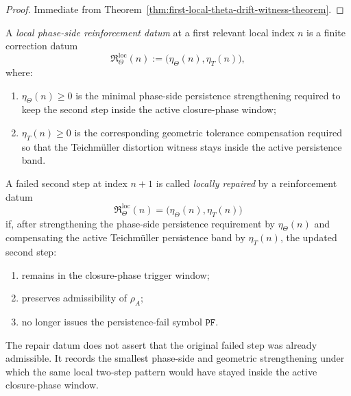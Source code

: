 \begin{proof}
Immediate from Theorem~\ref{thm:first-local-theta-drift-witness-theorem}.
\end{proof}


\begin{definition}
\label{def:local-phase-side-reinforcement-datum}
A \emph{local phase-side reinforcement datum} at a first relevant local index $n$ is a finite correction datum
\[
\mathfrak{R}_{\Theta}^{\mathrm{loc}}(n)
:=
\bigl(
\eta_{\Theta}(n),
\eta_{T}(n)
\bigr),
\]
where:
\begin{enumerate}
    \item $\eta_{\Theta}(n)\ge 0$ is the minimal phase-side persistence strengthening required to keep the second step inside the active closure-phase window;
    \item $\eta_{T}(n)\ge 0$ is the corresponding geometric tolerance compensation required so that the Teichm\"uller distortion witness stays inside the active persistence band.
\end{enumerate}
\end{definition}

\begin{definition}
\label{def:local-repaired-second-step}
A failed second step at index $n+1$ is called \emph{locally repaired} by a reinforcement datum
\[
\mathfrak{R}_{\Theta}^{\mathrm{loc}}(n)
=
\bigl(
\eta_{\Theta}(n),
\eta_{T}(n)
\bigr)
\]
if, after strengthening the phase-side persistence requirement by $\eta_{\Theta}(n)$ and compensating the active Teichm\"uller persistence band by $\eta_{T}(n)$, the updated second step:
\begin{enumerate}
    \item remains in the closure-phase trigger window;
    \item preserves admissibility of $\rho_A$;
    \item no longer issues the persistence-fail symbol $\mathtt{PF}$.
\end{enumerate}
\end{definition}

\begin{remark}
\label{rem:meaning-of-local-repair}
The repair datum does not assert that the original failed step was already admissible.
It records the smallest phase-side and geometric strengthening under which the same local two-step pattern would have stayed inside the active closure-phase window.
\end{remark}

